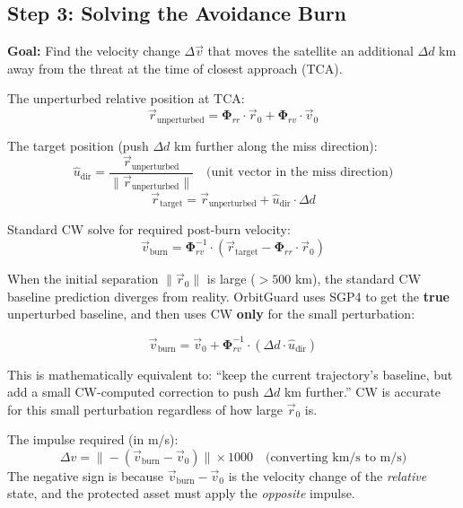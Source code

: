 \documentclass[12pt,a4paper]{article}
\begin{document}
\subsection{Step 3: Solving the Avoidance Burn}

\textbf{Goal:} Find the velocity change $\Delta\vec{v}$ that moves the satellite an additional $\Delta d$ km away from the threat at the time of closest approach (TCA).

\begin{formulabox}[title=Formula: Standard CW Targeting]
The unperturbed relative position at TCA:
\[
\vec{r}_{\text{unperturbed}} = \boldsymbol{\Phi}_{rr} \cdot \vec{r}_0 + \boldsymbol{\Phi}_{rv} \cdot \vec{v}_0
\]

The target position (push $\Delta d$ km further along the miss direction):
\[
\hat{u}_{\text{dir}} = \frac{\vec{r}_{\text{unperturbed}}}{\|\vec{r}_{\text{unperturbed}}\|} \quad \text{(unit vector in the miss direction)}
\]
\[
\vec{r}_{\text{target}} = \vec{r}_{\text{unperturbed}} + \hat{u}_{\text{dir}} \cdot \Delta d
\]

Standard CW solve for required post-burn velocity:
\[
\vec{v}_{\text{burn}} = \boldsymbol{\Phi}_{rv}^{-1} \cdot (\vec{r}_{\text{target}} - \boldsymbol{\Phi}_{rr} \cdot \vec{r}_0)
\]
\end{formulabox}

\begin{formulabox}[title=Formula: Perturbation-Only Targeting (OrbitGuard's Enhanced Method)]
When the initial separation $\|\vec{r}_0\|$ is large ($> 500$ km), the standard CW baseline prediction diverges from reality. OrbitGuard uses SGP4 to get the \textbf{true} unperturbed baseline, and then uses CW \textbf{only} for the small perturbation:

\[
\vec{v}_{\text{burn}} = \vec{v}_0 + \boldsymbol{\Phi}_{rv}^{-1} \cdot (\Delta d \cdot \hat{u}_{\text{dir}})
\]

This is mathematically equivalent to: ``keep the current trajectory's baseline, but add a small CW-computed correction to push $\Delta d$ km further.'' CW is accurate for this small perturbation regardless of how large $\vec{r}_0$ is.
\end{formulabox}

\begin{formulabox}[title=Formula: Delta-V Magnitude]
The impulse required (in m/s):
\[
\Delta v = \|-(\vec{v}_{\text{burn}} - \vec{v}_0)\| \times 1000 \quad \text{(converting km/s to m/s)}
\]
The negative sign is because $\vec{v}_{\text{burn}} - \vec{v}_0$ is the velocity change of the \textit{relative} state, and the protected asset must apply the \textit{opposite} impulse.
\end{formulabox}
\end{document}
